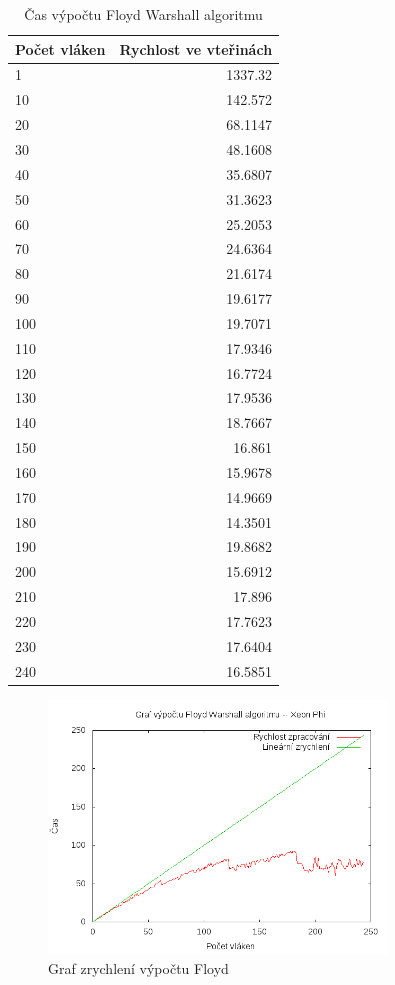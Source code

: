 \documentclass[a4paper,10pt]{article}
\begin{document}
\begin{table}[H]
  \centering
	\caption{Čas výpočtu Floyd Warshall algoritmu}
	\begin{tabular}{| l | r |}
\hline
Počet vláken & Rychlost ve vteřinách \\ \hline
1 & 1337.32 \\ \hline
10 & 142.572 \\ \hline
20 & 68.1147 \\ \hline
30 & 48.1608 \\ \hline
40 & 35.6807 \\ \hline
50 & 31.3623 \\ \hline
60 & 25.2053 \\ \hline
70 & 24.6364 \\ \hline
80 & 21.6174 \\ \hline
90 & 19.6177 \\ \hline
100 & 19.7071 \\ \hline
110 & 17.9346 \\ \hline
120 & 16.7724 \\ \hline
130 & 17.9536 \\ \hline
140 & 18.7667 \\ \hline
150 & 16.861 \\ \hline
160 & 15.9678 \\ \hline
170 & 14.9669 \\ \hline
180 & 14.3501 \\ \hline
190 & 19.8682 \\ \hline
200 & 15.6912 \\ \hline
210 & 17.896 \\ \hline
220 & 17.7623 \\ \hline
230 & 17.6404 \\ \hline
240 & 16.5851 \\ \hline
	\end{tabular}
  \label{tab:djph}
\end{table}

\begin{figure}[H]
  \centering
    \includegraphics[width=0.8\textwidth]{graf_floyd_phi.png}
  \caption{Graf zrychlení výpočtu Floyd}
  \label{fig:floydphi}
\end{figure}
\end{document}
